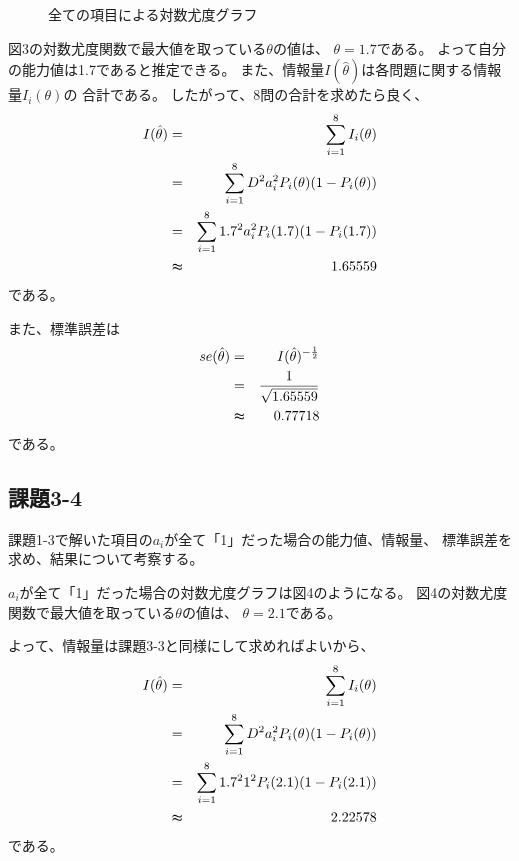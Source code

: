 \documentclass[12pt]{jarticle}
\begin{document}
\begin{figure}[h]
    \begin{center}
    \end{center}
    \caption{全ての項目による対数尤度グラフ}
\end{figure}
\clearpage


図3の対数尤度関数で最大値を取っている$\theta$の値は、
$\theta=1.7$である。
よって自分の能力値は1.7であると推定できる。
また、情報量$I(\hat{\theta})$は各問題に関する情報量$I_i({\theta})$の
合計である。
したがって、8問の合計を求めたら良く、
\begin{eqnarray*}
    I(\hat{\theta})&=&\sum_{i=1}^{8}{I_i({\theta})}\\
    &=&\sum_{i=1}^{8}{D^2a_i^2P_i(\theta)(1-P_i(\theta))}\\
    &=&\sum_{i=1}^{8}{1.7^2a_i^2P_i(1.7)(1-P_i(1.7))}\\
    &\thickapprox & 1.65559
\end{eqnarray*}
である。

また、標準誤差は
\begin{eqnarray*}
    se(\hat{\theta})&=&I(\hat{\theta})^{-\frac{1}{2}}\\
    &= &\frac{1}{\sqrt{ 1.65559}}\\
    &\thickapprox& 0.77718
\end{eqnarray*}
である。

\subsection{課題3-4}
\begin{shadebox}
    課題1-3で解いた項目の$a_i$が全て「1」だった場合の能力値、情報量、
    標準誤差を求め、結果について考察する。
\end{shadebox}



$a_i$が全て「1」だった場合の対数尤度グラフは図4のようになる。
図4の対数尤度関数で最大値を取っている$\theta$の値は、
$\theta=2.1$である。

よって、情報量は課題3-3と同様にして求めればよいから、
\begin{eqnarray*}
    I(\hat{\theta})&=&\sum_{i=1}^{8}{I_i({\theta})}\\
    &=&\sum_{i=1}^{8}{D^2a_i^2P_i(\theta)(1-P_i(\theta))}\\
    &=&\sum_{i=1}^{8}{1.7^2 1^2P_i(2.1)(1-P_i(2.1))}\\
    &\thickapprox & 2.22578
\end{eqnarray*}
である。
\end{document}

